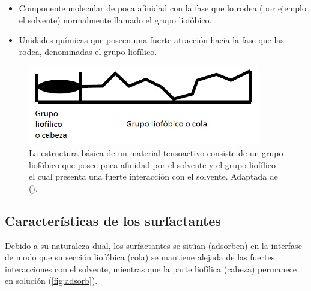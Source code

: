  \begin{itemize}
     \item Componente molecular de poca afinidad con la fase que lo rodea (por ejemplo el solvente) normalmente llamado el grupo liofóbico.
     \item  Unidades químicas que poseen una fuerte atracción hacia la fase que las rodea, denominadas el grupo liofílico.
 \end{itemize}

\begin{figure}
    \centering
    \includegraphics[width=0.9\textwidth]{Graphics/Tenso.png}
    \caption[Estructura de un tensoactivo]{La estructura básica de un material tensoactivo consiste de un grupo liofóbico que posee poca afinidad por el solvente y el grupo liofílico el cual presenta una fuerte interacción con el solvente. Adaptada de (\cite{Drew}). }
    \label{fig:Tenso}
\end{figure}


%

\subsection{Características de los surfactantes}

Debido a su naturaleza dual, los surfactantes se sitúan (adsorben) en la interfase de modo que su sección liofóbica (cola) se mantiene alejada de las fuertes interacciones con el solvente, mientras que la parte liofílica (cabeza) permanece en solución (\autoref{fig:adsorb}).

